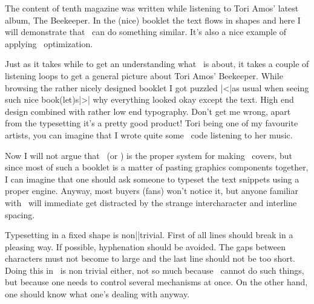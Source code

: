 
%


\startbuffer[abstract]
    The content of tenth magazine was written while listening to Tori Amos'
    latest album, The Beekeeper. In the (nice) booklet the text flows in shapes
    and here I will demonstrate that \TEX\ can do something similar. It's also a
    nice example of applying \HZ\ optimization.
\stopbuffer

\startdocument
  [title={Good looking shapes},
   author=Hans Hagen,
   affiliation=PRAGMA ADE,
   date=March 2005,
   number=10 \MKIV]

Just as it takes while to get an understanding what \TEX\ is about, it takes a
couple of listening loops to get a general picture about Tori Amos' Beekeeper.
While browsing the rather nicely designed booklet I got puzzled |<|as usual when
seeing such nice book(let)s|>| why everything looked okay except the text. High
end design combined with rather low end typography. Don't get me wrong, apart
from the typesetting it's a pretty good product! Tori being one of my favourite
artists, you can imagine that I wrote quite some \CONTEXT\ code listening to her
music.

Now I will not argue that \TEX\ (or \CONTEXT) is the proper system for making
\CD\ covers, but since most of such a booklet is a matter of pasting graphics
components together, I can imagine that one should ask someone to typeset the
text snippets using a proper engine. Anyway, most buyers (fans) won't notice it,
but anyone familiar with \TEX\ will immediate get distracted by the strange
intercharacter and interline spacing.

Typesetting in a fixed shape is non||trivial. First of all lines should break in
a pleasing way. If possible, hyphenation should be avoided. The gaps between
characters must not become to large and the last line should not be too short.
Doing this in \TEX\ is non trivial either, not so much because \TEX\ cannot do
such things, but because one needs to control several mechanisms at once. On the
other hand, one should know what one's dealing with anyway.


